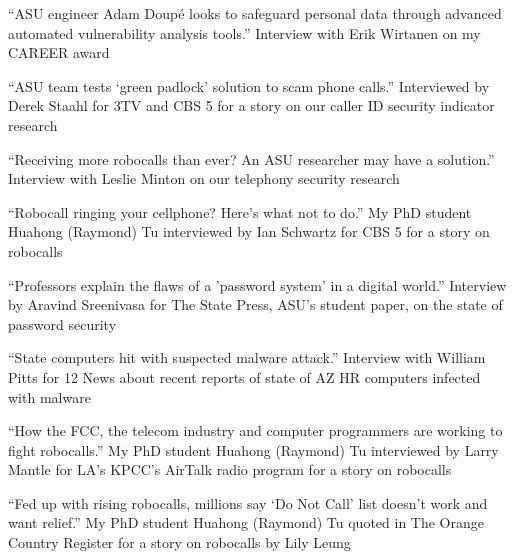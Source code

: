 \documentclass[11pt,letterpaper,sans]{moderncv}
\begin{document}




 {``ASU engineer Adam Doup\'e looks to
  safeguard personal data through advanced automated vulnerability
  analysis tools.'' Interview with Erik Wirtanen on my CAREER award} 

 {``ASU team tests `green padlock' solution to
  scam phone calls.'' Interviewed by Derek Staahl for 3TV and CBS 5
  for a story on our caller ID security indicator research}

 {``Receiving more robocalls than ever? An ASU
  researcher may have a solution.'' Interview with Leslie Minton on our
  telephony security research}

 {``Robocall ringing your cellphone? Here's
  what not to do.'' My PhD student Huahong (Raymond) Tu interviewed by
  Ian Schwartz for CBS 5 for a story on robocalls}

 {``Professors explain the flaws of a
  'password system' in a digital world.'' Interview by Aravind
  Sreenivasa for The State Press, ASU's student paper, on the state of
  password security}

 {``State computers hit with suspected
  malware attack.'' Interview with William Pitts for 12 News about
  recent reports of state of AZ HR computers infected with malware}

 {``How the FCC, the telecom industry and
  computer programmers are working to fight robocalls.'' My PhD
  student Huahong (Raymond) Tu interviewed by Larry Mantle for LA’s KPCC’s AirTalk radio program for a story on robocalls}

 {``Fed up with rising robocalls, millions
  say ‘Do Not Call’ list doesn’t work and want relief.'' My PhD
  student Huahong (Raymond) Tu quoted in The Orange Country Register for a story on robocalls by Lily Leung}
\end{document}
